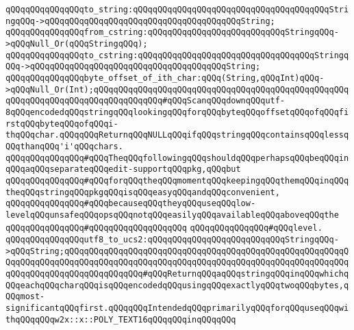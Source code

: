 \verb|qQQqqQQqqQQqqQQqto_string:qQQqqQQqqQQqqQQqqQQqqQQqqQQqqQQqqQQqqQQqStringqQQq->qQQqqQQqqQQqqQQqqQQqqQQqqQQqqQQqqQQqqQQqString;|\newline
\verb|qQQqqQQqqQQqqQQqfrom_cstring:qQQqqQQqqQQqqQQqqQQqqQQqqQQqStringqQQq->qQQqNull_Or(qQQqStringqQQq);|\newline
\verb|qQQqqQQqqQQqqQQqto_cstring:qQQqqQQqqQQqqQQqqQQqqQQqqQQqqQQqqQQqStringqQQq->qQQqqQQqqQQqqQQqqQQqqQQqqQQqqQQqqQQqqQQqString;|\newline
\newline
\verb|qQQqqQQqqQQqqQQqbyte_offset_of_ith_char:qQQq(String,qQQqInt)qQQq->qQQqNull_Or(Int);qQQqqQQqqQQqqQQqqQQqqQQqqQQqqQQqqQQqqQQqqQQqqQQqqQQqqQQqqQQqqQQqqQQqqQQqqQQqqQQqqQQq#qQQqScanqQQqdownqQQqutf-8qQQqencodedqQQqstringqQQqlookingqQQqforqQQqbyteqQQqoffsetqQQqofqQQqfirstqQQqbyteqQQqofqQQqi-thqQQqchar.qQQqqQQqReturnqQQqNULLqQQqifqQQqstringqQQqcontainsqQQqlessqQQqthanqQQq'i'qQQqchars.|\newline
\newline
\newline
\newline
\verb|qQQqqQQqqQQqqQQq#qQQqTheqQQqfollowingqQQqshouldqQQqperhapsqQQqbeqQQqinqQQqaqQQqseparateqQQqedit-supportqQQqpkg,qQQqbut|\newline
\verb|qQQqqQQqqQQqqQQq#qQQqforqQQqtheqQQqmomentqQQqkeepingqQQqthemqQQqinqQQqtheqQQqstringqQQqpkgqQQqisqQQqeasyqQQqandqQQqconvenient,|\newline
\verb|qQQqqQQqqQQqqQQq#qQQqbecauseqQQqtheyqQQquseqQQqlow-levelqQQqunsafeqQQqopsqQQqnotqQQqeasilyqQQqavailableqQQqaboveqQQqthe|\newline
\verb|qQQqqQQqqQQqqQQq#qQQqqQQqqQQqqQQqqQQq|\newline
\verb|qQQqqQQqqQQqqQQq#qQQqlevel.|\newline
\newline
\verb|qQQqqQQqqQQqqQQqutf8_to_ucs2:qQQqqQQqqQQqqQQqqQQqqQQqqQQqStringqQQq->qQQqString;qQQqqQQqqQQqqQQqqQQqqQQqqQQqqQQqqQQqqQQqqQQqqQQqqQQqqQQqqQQqqQQqqQQqqQQqqQQqqQQqqQQqqQQqqQQqqQQqqQQqqQQqqQQqqQQqqQQqqQQqqQQqqQQqqQQqqQQqqQQqqQQqqQQqqQQqqQQq#qQQqReturnqQQqaqQQqstringqQQqinqQQqwhichqQQqeachqQQqcharqQQqisqQQqencodedqQQqusingqQQqexactlyqQQqtwoqQQqbytes,qQQqmost-significantqQQqfirst.qQQqqQQqIntendedqQQqprimarilyqQQqforqQQquseqQQqwithqQQqqQQqw2x::x::POLY_TEXT16qQQqqQQqinqQQqqQQq|\newline
